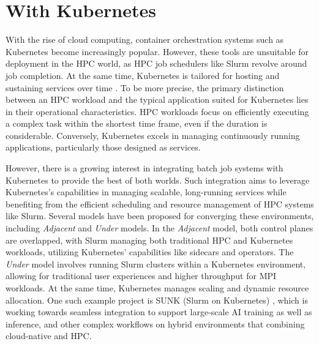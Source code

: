 \section{With Kubernetes}

With the rise of cloud computing, container orchestration systems such as Kubernetes become increasingly popular. However, these tools are unsuitable for deployment in the HPC world, as HPC job schedulers like Slurm revolve around job completion. At the same time, Kubernetes is tailored for hosting and sustaining services over time \cite{9235080}. To be more precise, the primary distinction between an HPC workload and the typical application suited for Kubernetes lies in their operational characteristics. HPC workloads focus on efficiently executing a complex task within the shortest time frame, even if the duration is considerable. Conversely, Kubernetes excels in managing continuously running applications, particularly those designed as services.

However, there is a growing interest in integrating batch job systems with Kubernetes to provide the best of both worlds. Such integration aims to leverage Kubernetes's capabilities in managing scalable, long-running services while benefiting from the efficient scheduling and resource management of HPC systems like Slurm. Several models have been proposed for converging these environments, including \textit{Adjacent} and \textit{Under} models. In the \textit{Adjacent} model, both control planes are overlapped, with Slurm managing both traditional HPC and Kubernetes workloads, utilizing Kubernetes' capabilities like sidecars and operators. The \textit{Under} model involves running Slurm clusters within a Kubernetes environment, allowing for traditional user experiences and higher throughput for MPI workloads. At the same time, Kubernetes manages scaling and dynamic resource allocation. One such example project is SUNK (Slurm on Kubernetes) \cite{SlurmK8sIntegration}, which is working towards seamless integration to support large-scale AI training as well as inference, and other complex workflows on hybrid environments that combining cloud-native and HPC.